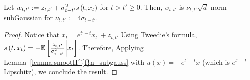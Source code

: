 
\begin{lemma}\label{lemma:subGaussianity_1}
    Let $w_{t,t'} := z_{t,t'} + \sigma_{t-t'}^{2}s\left(t, x_t\right)$ for $t > t' \geq 0$. Then, $w_{t,t'}$ is $\nu_{t,t'}\sqrt{d}$ norm subGaussian for $\nu_{t,t'} := 4\sigma_{t-t'}$.
\end{lemma}
\begin{proof}
Notice that $x_t = e^{t'-t}x_{t'} + z_{t,t'}$
Using Tweedie's formula, $s\left(t, x_t\right) = -\mathbb{E}\left[\frac{z_{t,t'}}{\sigma_{t-t'}^{2}}\bigg|x_{t}\right]$. Therefore, 
Applying Lemma~\ref{lemma:smootH^{f}n_subgauss} with $u(x) = -e^{t'-t}x$ (which is $e^{t'-t}$ Lipschitz), we conclude the result.
\end{proof}


